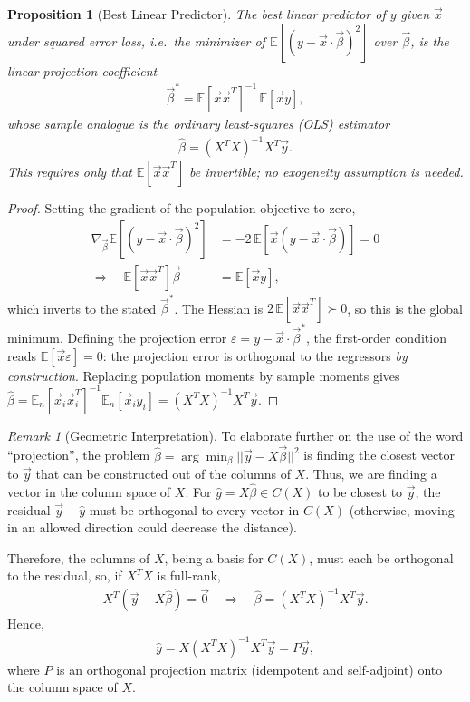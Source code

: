 \documentclass[11pt]{article}
\theoremstyle{definition}
\theoremstyle{plain}
\newtheorem{proposition}{Proposition}[section]
\theoremstyle{remark}
\newtheorem{remark}{Remark}[section]
\begin{document}
\begin{proposition}[Best Linear Predictor]
    The best linear predictor of $y$ given $\vec{x}$ under squared error loss, i.e.\ the minimizer of $\mathbb{E}[(y - \vec{x}\cdot\vec{\beta})^2]$ over $\vec{\beta}$, is the \emph{linear projection} coefficient
    \begin{align}
        \vec{\beta}^* = \mathbb{E}[\vec{x}\vec{x}^T]^{-1}\,\mathbb{E}[\vec{x}y],
    \end{align}
    whose sample analogue is the ordinary least-squares (OLS) estimator
    \begin{align}
        \hat{\beta}= (X^TX)^{-1}X^T\vec{y}.
    \end{align}
    This requires only that $\mathbb{E}[\vec{x}\vec{x}^T]$ be invertible; \emph{no exogeneity assumption is needed}.
\end{proposition}
\begin{proof}
    Setting the gradient of the population objective to zero,
    \begin{align}
        \nabla_{\vec{\beta}} \mathbb{E}[(y-\vec{x}\cdot \vec{\beta})^2] &= -2\,\mathbb{E}[\vec{x}(y-\vec{x}\cdot \vec{\beta})] = 0 \\
        \Longrightarrow \quad \mathbb{E}[\vec{x}\vec{x}^T]\vec{\beta} &= \mathbb{E}[\vec{x}y],
    \end{align}
    which inverts to the stated $\vec{\beta}^*$. The Hessian is $2\,\mathbb{E}[\vec{x}\vec{x}^T] \succ 0$, so this is the global minimum. Defining the projection error $\varepsilon = y - \vec{x}\cdot\vec{\beta}^*$, the first-order condition reads $\mathbb{E}[\vec{x}\varepsilon] = 0$: the projection error is orthogonal to the regressors \emph{by construction}. Replacing population moments by sample moments gives $\hat{\beta} = \mathbb{E}_n[\vec{x}_i\vec{x}_i^T]^{-1}\mathbb{E}_n[\vec{x}_i y_i] = (X^TX)^{-1}X^T\vec{y}$.
\end{proof}

\begin{remark}[Geometric Interpretation]

To elaborate further on the use of the word ``projection'', the problem $\hat{\beta} = \arg \min_\beta ||\vec{y} - X\vec{\beta}||^2$ is finding the closest vector to $\vec{y}$ that can be constructed out of the columns of $X$. Thus, we are finding a vector in the column space of $X$. For $\hat{y}=X\hat{\beta} \in C(X)$ to be closest to $\vec{y}$, the residual $\vec{y} - \hat{y}$ must be orthogonal to every vector in $C(X)$ (otherwise, moving in an allowed direction could decrease the distance). 

Therefore, the columns of $X$, being a basis for $C(X)$, must each be orthogonal to the residual, so, if $X^TX$ is full-rank,
\begin{align}
    X^T(\vec{y}-X\hat{\beta})=\vec{0} \quad \Rightarrow \quad\hat{\beta} = (X^TX)^{-1}X^T\vec{y}.
\end{align}
Hence, 
\begin{align}
    \hat{y} = X(X^TX)^{-1}X^T\vec{y} = P\vec{y},
\end{align}
where $P$ is an orthogonal projection matrix (idempotent and self-adjoint) onto the column space of $X$.
\end{remark}
\end{document}
